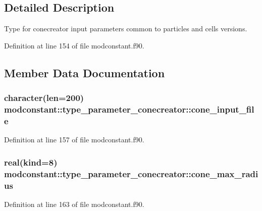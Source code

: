 \subsection{Detailed Description}
Type for conecreator input parameters common to particles and cells versions. 

Definition at line 154 of file modconstant.\-f90.



\subsection{Member Data Documentation}
\hypertarget{structmodconstant_1_1type__parameter__conecreator_a2bdd6648e859eb4c798e2298fe6647b1}{
\subsubsection[{cone\-\_\-input\-\_\-file}]{\setlength{\rightskip}{0pt plus 5cm}character(len=200) modconstant\-::type\-\_\-parameter\-\_\-conecreator\-::cone\-\_\-input\-\_\-file}}\label{structmodconstant_1_1type__parameter__conecreator_a2bdd6648e859eb4c798e2298fe6647b1}


Definition at line 157 of file modconstant.\-f90.

\hypertarget{structmodconstant_1_1type__parameter__conecreator_a86915502305c5da4d6eec7273448f947}{
\subsubsection[{cone\-\_\-max\-\_\-radius}]{\setlength{\rightskip}{0pt plus 5cm}real(kind=8) modconstant\-::type\-\_\-parameter\-\_\-conecreator\-::cone\-\_\-max\-\_\-radius}}\label{structmodconstant_1_1type__parameter__conecreator_a86915502305c5da4d6eec7273448f947}


Definition at line 163 of file modconstant.\-f90.

